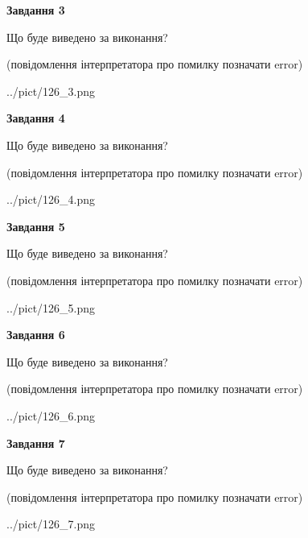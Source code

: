 \documentclass[12pt, ukrainian]{article}
\begin{document}
{\begin {large}
{\begin {center}\textbf{Завдання 3}\end {center}}\par
Що буде виведено за виконання?\par
 (повідомлення інтерпретатора про помилку позначати error)\par
\begin{center}
	{../pict/126_3.png}
\end{center}
\newpage

{\begin {center}\textbf{Завдання 4}\end {center}}\par
Що буде виведено за виконання?\par
 (повідомлення інтерпретатора про помилку позначати error)\par
\begin{center}
	{../pict/126_4.png}
\end{center}
\newpage

{\begin {center}\textbf{Завдання 5}\end {center}}\par
Що буде виведено за виконання?\par
 (повідомлення інтерпретатора про помилку позначати error)\par
\begin{center}
	{../pict/126_5.png}
\end{center}
\newpage

{\begin {center}\textbf{Завдання 6}\end {center}}\par
Що буде виведено за виконання?\par
 (повідомлення інтерпретатора про помилку позначати error)\par
\begin{center}
	{../pict/126_6.png}
\end{center}
\newpage

{\begin {center}\textbf{Завдання 7}\end {center}}\par
Що буде виведено за виконання?\par
 (повідомлення інтерпретатора про помилку позначати error)\par
\begin{center}
	{../pict/126_7.png}
\end{center}
\newpage


\end{large}}
\end{document}
